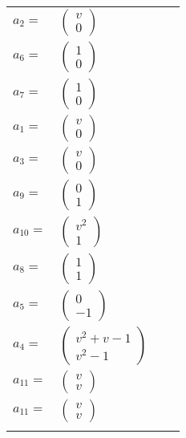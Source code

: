 \documentclass[1p]{elsarticle_modified}
\theoremstyle{definition}
\begin{document}
\begin{tabular}{m{7pt} m{180pt} m{7pt} m{180pt} }
\flushright $a_{2}=$&$\begin{pmatrix}v\\0\end{pmatrix}$ \\
\flushright $a_{6}=$&$\begin{pmatrix}1\\0\end{pmatrix}$ \\
\flushright $a_{7}=$&$\begin{pmatrix}1\\0\end{pmatrix}$ \\
\flushright $a_{1}=$&$\begin{pmatrix}v\\0\end{pmatrix}$ \\
\flushright $a_{3}=$&$\begin{pmatrix}v\\0\end{pmatrix}$ \\
\flushright $a_{9}=$&$\begin{pmatrix}0\\1\end{pmatrix}$ \\
\flushright $a_{10}=$&$\begin{pmatrix}v^2\\1\end{pmatrix}$ \\
\flushright $a_{8}=$&$\begin{pmatrix}1\\1\end{pmatrix}$ \\
\flushright $a_{5}=$&$\begin{pmatrix}0\\-1\end{pmatrix}$ \\
\flushright $a_{4}=$&$\begin{pmatrix}v^2+v-1\\v^2-1\end{pmatrix}$ \\
\flushright $a_{11}=$&$\begin{pmatrix}v\\v\end{pmatrix}$\\ \flushright $a_{11}=$&$\begin{pmatrix}v\\v\end{pmatrix}$\\&\end{tabular}
\end{document}
